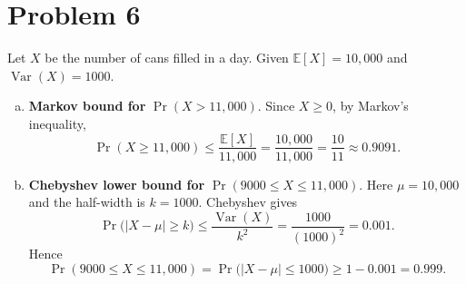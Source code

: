 \section*{Problem 6}

Let $X$ be the number of cans filled in a day. Given $\mathbb{E}[X]=10{,}000$ and $\operatorname{Var}(X)=1000$.

\begin{enumerate}[(a)]
\item \textbf{Markov bound for } $\Pr(X>11{,}000)$.
Since $X\ge 0$, by Markov's inequality,
\[
\Pr(X\ge 11{,}000)\le \frac{\mathbb{E}[X]}{11{,}000}
=\frac{10{,}000}{11{,}000}
=\frac{10}{11}\approx 0.9091.
\]

\item \textbf{Chebyshev lower bound for } $\Pr(9000\le X\le 11{,}000)$.
Here $\mu=10{,}000$ and the half-width is $k=1000$. Chebyshev gives
\[
\Pr\big(|X-\mu|\ge k\big)\le \frac{\operatorname{Var}(X)}{k^{2}}
=\frac{1000}{(1000)^2}=0.001.
\]
Hence
\[
\Pr(9000\le X\le 11{,}000)=\Pr\big(|X-\mu|\le 1000\big)
\ge 1-0.001 = 0.999.
\]
\end{enumerate}
